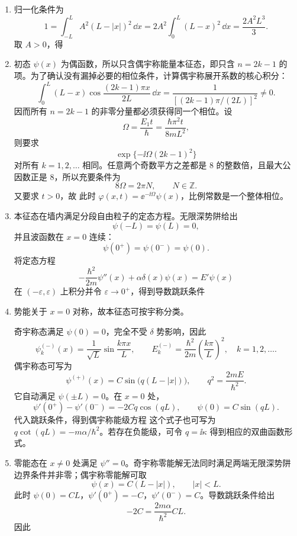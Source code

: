 \begin{question}[共 30 分]
\begin{solution}
\begin{enumerate}
{  }
  等价地，$n=2k-1$ 为偶宇称态，$n=2k$ 为奇宇称态：
  \[
  \psi_{2k-1}(x)=\frac{(-1)^{k-1}}{\sqrt L}\cos\frac{(2k-1)\pi x}{2L},\qquad
  \psi_{2k}(x)=\frac{(-1)^k}{\sqrt L}\sin\frac{k\pi x}{L}.
  \]
  \item 归一化条件为
  \[
  1=\int_{-L}^{L}A^2(L-|x|)^2\,\dd{x}
  =2A^2\int_0^L(L-x)^2\,\dd{x}
  =\frac{2A^2L^3}{3}.
  \]
  取 $A>0$，得
  \item 初态 $\psi(x)$ 为偶函数，所以只含偶宇称能量本征态，即只含 $n=2k-1$ 的项。为了确认没有漏掉必要的相位条件，计算偶宇称展开系数的核心积分：
  \[
  \int_0^L(L-x)\cos\frac{(2k-1)\pi x}{2L}\,\dd{x}
  =\frac{1}{\left[(2k-1)\pi/(2L)\right]^2}\ne 0.
  \]
  因而所有 $n=2k-1$ 的非零分量都必须获得同一个相位。设
  \[
  \Omega=\frac{E_1t}{\hbar}=\frac{\hbar\pi^2t}{8mL^2},
  \]
  则要求
  \[
  \exp\{-\ii\Omega(2k-1)^2\}
  \]
  对所有 $k=1,2,\dots$ 相同。任意两个奇数平方之差都是 $8$ 的整数倍，且最大公因数正是 $8$，所以充要条件为
  \[
  8\Omega=2\pi N,
  \qquad N\in\mathbb Z.
  \]
  又要求 $t>0$，故
  此时 $\varphi(x,t)=\ee^{-\ii\Omega}\psi(x)$，比例常数是一个整体相位。
  \item 本征态在墙内满足分段自由粒子的定态方程。无限深势阱给出
  \[
  \psi(-L)=\psi(L)=0,
  \]
  并且波函数在 $x=0$ 连续：
  \[
  \psi(0^+)=\psi(0^-)=\psi(0).
  \]
  将定态方程
  \[
  -\frac{\hbar^2}{2m}\psi''(x)+\alpha\delta(x)\psi(x)=E'\psi(x)
  \]
  在 $(-\varepsilon,\varepsilon)$ 上积分并令 $\varepsilon\to0^+$，得到导数跳跃条件
  \item 势能关于 $x=0$ 对称，故本征态可按宇称分类。

  奇宇称态满足 $\psi(0)=0$，完全不受 $\delta$ 势影响，因此
  \[
  \psi_k^{(-)}(x)=\frac{1}{\sqrt L}\sin\frac{k\pi x}{L},\qquad
  E_k^{(-)}=\frac{\hbar^2}{2m}\left(\frac{k\pi}{L}\right)^2,
  \quad k=1,2,\dots .
  \]
  偶宇称态可写为
  \[
  \psi^{(+)}(x)=C\sin\bigl(q(L-|x|)\bigr),\qquad q^2=\frac{2mE}{\hbar^2}.
  \]
  它自动满足 $\psi(\pm L)=0$。在 $x=0$ 处，
  \[
  \psi'(0^+)-\psi'(0^-)=-2Cq\cos(qL),\qquad \psi(0)=C\sin(qL).
  \]
  代入跳跃条件，得到偶宇称能级方程
  这个式子也可写为 $q\cot(qL)=-m\alpha/\hbar^2$。若存在负能级，可令 $q=\ii\kappa$ 得到相应的双曲函数形式。
  \item 零能态在 $x\ne0$ 处满足 $\psi''=0$。奇宇称零能解无法同时满足两端无限深势阱边界条件并非零；偶宇称零能解可取
  \[
  \psi(x)=C(L-|x|),\qquad |x|<L.
  \]
  此时 $\psi(0)=CL$，$\psi'(0^+)=-C$，$\psi'(0^-)=C$。导数跳跃条件给出
  \[
  -2C=\frac{2m\alpha}{\hbar^2}CL.
  \]
  因此
\end{enumerate}
\end{solution}
\end{question}

